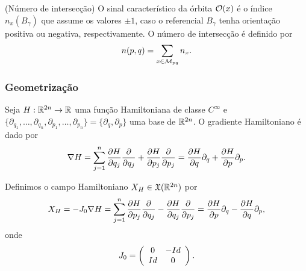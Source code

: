\documentclass{beamer}
\begin{document}
	\begin{frame}
		\begin{definicao}
			(Número de intersecção) O sinal característico da órbita $\mathcal{O}(x)$ é o índice $n_{x}(B_{\gamma})$ que assume os valores $\pm 1$, caso o referencial $B_{\gamma}$ tenha orientação positiva ou negativa, respectivamente. O número de intersecção é definido por 
			$$
			n(p,q) = \sum_{x \in \mathcal{M}_{pq} }n_{x}.
			$$
		\end{definicao}
		
	\end{frame}
	
	\begin{frame}
		\frametitle{Geometrização}
		
		Seja $H:\mathbb{R}^{2n} \to \mathbb{R}^{}$ uma função Hamiltoniana de classe $C^{\infty}$ e $\{\partial_{q_{1}}, \dots, \partial_{q_{n}}, \partial_{p_{1}}, \dots, \partial_{p_{n}}\}=\{\partial_{q}, \partial_{p}\}$ uma base de $\mathbb{R}^{2n}$. O gradiente Hamiltoniano é dado por
		$$
		\nabla H =\sum_{j=1}^{n}\frac{\partial H}{\partial q_{j}}\frac{\partial }{\partial q_{j}} + \frac{\partial H}{\partial p_{j}}\frac{\partial }{\partial p_{j}} = \frac{\partial H}{\partial q}\partial_{q} + \frac{\partial H}{\partial p}\partial_{p}.
		$$
		
		Definimos o campo Hamiltoniano $X_{H} \in \mathfrak{X}(\mathbb{R}^{2n})$ por 
		$$
		X_{H} = -J_{0} \nabla H = \sum_{j=1}^{n}\frac{\partial H}{\partial p_{j}}\frac{\partial }{\partial q_{j}} - \frac{\partial H}{\partial q_{j}}\frac{\partial }{\partial p_{j}} = \frac{\partial H}{\partial p}\partial_{q} - \frac{\partial H}{\partial q}\partial_{p}, 
		$$
		onde
		$$
		J_{0}=
		\left(
		\begin{array}{cc}
		0 & -Id
		\\
		Id & 0
		\end{array}
		\right). 
		$$
	\end{frame}
	
\end{document}
